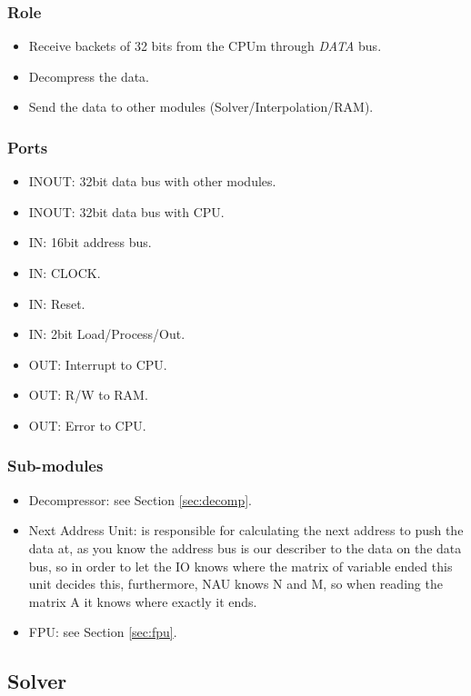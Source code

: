 \documentclass[12pt]{report}
\begin{document}
\subsubsection{Role}
\begin{itemize}
    \item Receive backets of 32 bits from the CPUm through \emph{DATA} bus.
    \item Decompress the data.
    \item Send the data to other modules (Solver/Interpolation/RAM).
\end{itemize}

\subsubsection{Ports}
\begin{itemize}
    \item INOUT: 32bit data bus with other modules.
    \item INOUT: 32bit data bus with CPU.
    \item IN: 16bit address bus.
    \item IN: CLOCK.
    \item IN: Reset.
    \item IN: 2bit Load/Process/Out.
    \item OUT: Interrupt to CPU.
    \item OUT: R/W to RAM.
    \item OUT: Error to CPU.
\end{itemize}

\subsubsection{Sub-modules}

\begin{itemize}
    \item {Decompressor}: see Section \ref{sec:decomp}.
    \item {Next Address Unit}: is responsible for calculating the next address to push the data at, as you know the address bus is our describer to the data on the data bus, so in order to let the IO knows where the matrix of variable ended this unit decides this, furthermore, {NAU} knows {N} and {M}, so when reading the matrix {A} it knows where exactly it ends.
    \item {FPU}: see Section \ref{sec:fpu}.
\end{itemize}

\subsection{Solver}
\end{document}
